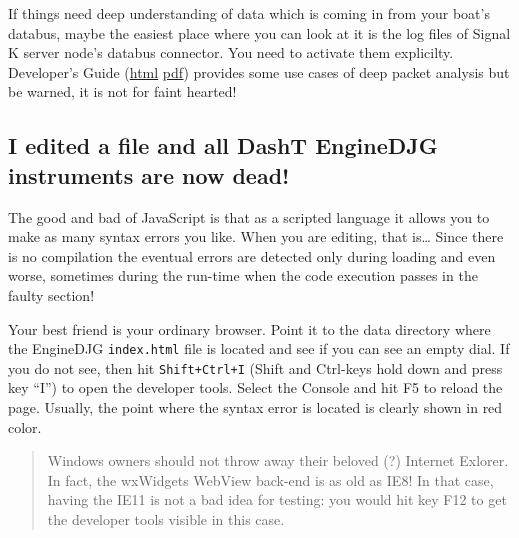 \documentclass[11pt]{article}
\begin{document}
    If things need deep understanding of data which is coming in from your
boat's databus, maybe the easiest place where you can look at it is the
log files of Signal K server node's databus connector. You need to
activate them explicilty. Developer's Guide
(\href{./developers/README.html}{html} \textbar{}
\href{./developers/README.pdf}{pdf}) provides some use cases of deep
packet analysis but be warned, it is not for faint hearted!

    \hypertarget{i-edited-a-file-and-all-dasht-enginedjg-instruments-are-now-dead}{%
\subsection{I edited a file and all DashT EngineDJG instruments are now
dead!}\label{i-edited-a-file-and-all-dasht-enginedjg-instruments-are-now-dead}}

    The good and bad of JavaScript is that as a scripted language it allows
you to make as many syntax errors you like. When you are editing, that
is\ldots{} Since there is no compilation the eventual errors are
detected only during loading and even worse, sometimes during the
run-time when the code execution passes in the faulty section!

    Your best friend is your ordinary browser. Point it to the data
directory where the EngineDJG \texttt{index.html} file is located and
see if you can see an empty dial. If you do not see, then hit
\texttt{Shift+Ctrl+I} (Shift and Ctrl-keys hold down and press key
``I'') to open the developer tools. Select the Console and hit F5 to
reload the page. Usually, the point where the syntax error is located is
clearly shown in red color.

    \begin{quote}
Windows owners should not throw away their beloved (?) Internet Exlorer.
In fact, the wxWidgets WebView back-end is as old as IE8! In that case,
having the IE11 is not a bad idea for testing: you would hit key F12 to
get the developer tools visible in this case.
\end{quote}


    
    
    
\end{document}
